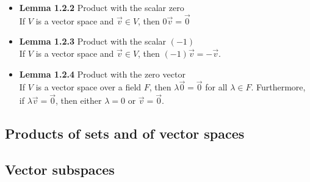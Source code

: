\documentclass[11pt,a4paper]{article}
\begin{document}
\begin{itemize}
    \item \textbf{Lemma 1.2.2} Product with the scalar zero \\
        If $V$ is a vector space and $\vec{v} \in V$, then $0\vec{v} = \vec{0}$

    \item \textbf{Lemma 1.2.3} Product with the scalar $(-1)$ \\
        If $V$ is a vector space and $\vec{v} \in V$, then $(-1)\vec{v} = -\vec{v}$.

    \item \textbf{Lemma 1.2.4} Product with the zero vector \\
        If $V$ is a vector space over a field $F$, then $\lambda\vec{0} = \vec{0}$
        for all $\lambda \in F$.
        Furthermore, if $\lambda \vec{v} = \vec{0}$,
        then either $\lambda = 0$ or $\vec{v} = \vec{0}$.

\end{itemize}

\subsection{Products of sets and of vector spaces}

\subsection{Vector subspaces}
\end{document}
